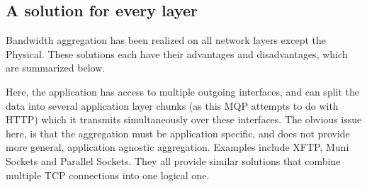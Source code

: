 \documentclass{article}
\begin{document}
\subsection{A solution for every layer}

Bandwidth aggregation has been realized on all network layers except the Physical. These solutions each have their advantages and disadvantages, which are summarized below.

Here, the application has access to multiple outgoing interfaces, and can split the data into several application layer chunks (as this MQP attempts to do with HTTP) which it transmits simultaneously over these interfaces. The obvious issue here, is that the aggregation must be application specific, and does not provide more general, application agnostic aggregation. Examples include XFTP, Muni Sockets and Parallel Sockets. They all provide similar solutions that combine multiple TCP connections into one logical one.
\end{document}
